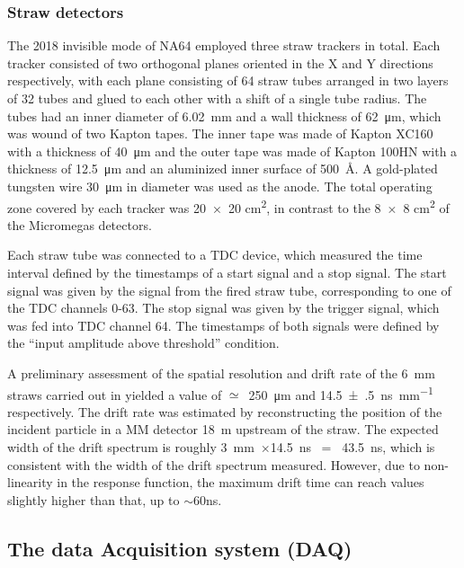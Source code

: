 \subsubsection{Straw detectors}

The 2018 invisible mode of NA64 employed three straw trackers in total. Each tracker consisted of two orthogonal planes oriented in the X and Y directions respectively, with each plane consisting of 64 straw tubes arranged in two layers of 32 tubes and glued to each other with a shift of a single tube radius. The tubes had an inner diameter of \SI{6.02}{\milli\metre} and a wall thickness of \SI{62}{\micro\metre}, which was wound of two Kapton tapes. The inner tape was made of Kapton XC160 with a thickness of \SI{40}{\micro\metre} and the outer tape was made of Kapton 100HN with a thickness of \SI{12.5}{\micro\metre} and an aluminized inner surface of \SI{500}{\angstrom}. A gold-plated tungsten wire 30~μm in diameter was used as the anode. The total operating zone covered by each tracker was \num{20 x 20} \si{\square\centi\metre}, in contrast to the \num{8 x 8} \si{\square\centi\metre} of the Micromegas detectors.

Each straw tube was connected to a TDC device, which measured the time interval defined by the timestamps of a start signal and a stop signal. The start signal was given by the signal from the fired straw tube, corresponding to one of the TDC channels 0-63. The stop signal was given by the trigger signal, which was fed into TDC channel 64. The timestamps of both signals were defined by the ``input amplitude above threshold'' condition.

A preliminary assessment of the spatial resolution and drift rate of the 6~mm straws carried out in \cite{Volkov:2019qhb} yielded a value of $\simeq$~\SI{250}{\micro\metre} and \SI[separate-uncertainty = true,per-mode=symbol]{14.5(5)}{\nano\second\per\milli\metre} respectively. The drift rate was estimated by reconstructing the position of the incident particle in a MM detector \SI{18}{\metre} upstream of the straw. The expected width of the drift spectrum is roughly 3~mm~$\times$14.5~ns~ = ~43.5~ns, which is consistent with the width of the drift spectrum measured. However, due to non-linearity in the response function, the maximum drift time can reach values slightly higher than that, up to $\sim$60ns.


\subsection{The data Acquisition system (DAQ)}
\label{ch2:sec:daq}

